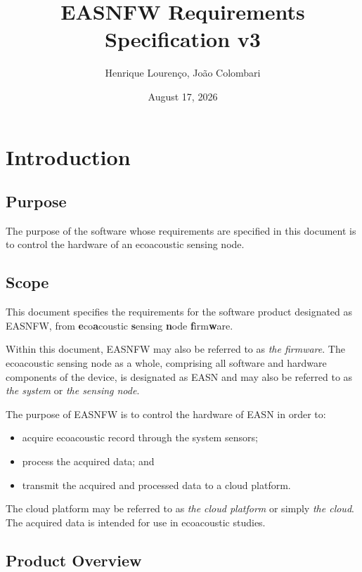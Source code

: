 \documentclass[11pt,a4paper]{article}
\title{EASNFW Requirements Specification v3}
\author{Henrique Lourenço, João Colombari}
\date{August 17, 2026}
\begin{document}
\maketitle

\tableofcontents
\clearpage

\section{Introduction}

\subsection{Purpose}

The purpose of the software whose requirements are specified in this document
is to control the hardware of an ecoacoustic sensing node.

\subsection{Scope}

This document specifies the requirements for the software product designated
as EASNFW, from \textbf{e}co\textbf{a}coustic \textbf{s}ensing \textbf{n}ode
\textbf{f}irm\textbf{w}are.

Within this document, EASNFW may also be referred to as \textit{the firmware}.
The ecoacoustic sensing node as a whole, comprising all software and hardware
components of the device, is designated as EASN and may also be referred to as
\textit{the system} or \textit{the sensing node}.

The purpose of EASNFW is to control the hardware of EASN in order to:

\begin{itemize}
    \item acquire ecoacoustic record through the system sensors;
    \item process the acquired data; and
    \item transmit the acquired and processed data to a cloud platform.
\end{itemize}

The cloud platform may be referred to as \textit{the cloud platform} or simply
\textit{the cloud}. The acquired data is intended for use in ecoacoustic
studies.

\subsection{Product Overview}
\end{document}
